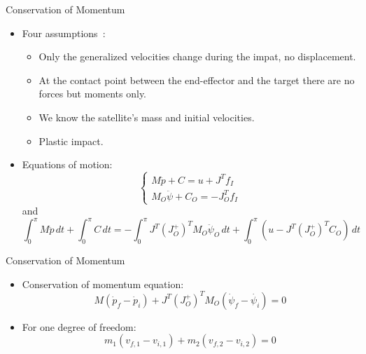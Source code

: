 \begin{frame}{Conservation of Momentum}
    \begin{itemize}
        \item Four assumptions~\cite{1997}: \begin{itemize}
            \item Only the generalized velocities change during the impat, no displacement.
            \item At the contact point between the end-effector and the target there are no forces but moments only.
            \item We know the satellite's mass and initial velocities.
            \item Plastic impact.
        \end{itemize}
        \item Equations of motion: \begin{equation}
                \begin{cases}
                  M\ddot{p}+C=u+J^Tf_I\\
                  M_O\ddot{\psi}+C_O=-J_O^Tf_I
                \end{cases}
              \end{equation}
              and \begin{equation}
                \int_{0}^{\pi}M\ddot{p}\,dt+\int_{0}^{\pi}C\,dt =-\int_{0}^{\pi}J^T(J_O^+)^TM_O\ddot{\psi}_O\,dt+\int_{0}^{\pi}(u-J^T(J_O^+)^TC_O)\,dt
              \end{equation}
    \end{itemize}
\end{frame}

\begin{frame}{Conservation of Momentum}
\begin{itemize}
    \item Conservation of momentum equation:
    \begin{equation}
        M(\dot{p}_f-\dot{p}_i)+J^T(J_O^+)^TM_O(\dot{\psi}_f-\dot{\psi_i})=0
        \label{conservation}
      \end{equation}
    \item For one degree of freedom:
    \begin{equation}
        m_1(v_{f,1}-v_{i,1})+m_2(v_{f,2}-v_{i,2})=0
      \end{equation}
\end{itemize}    
\end{frame}


